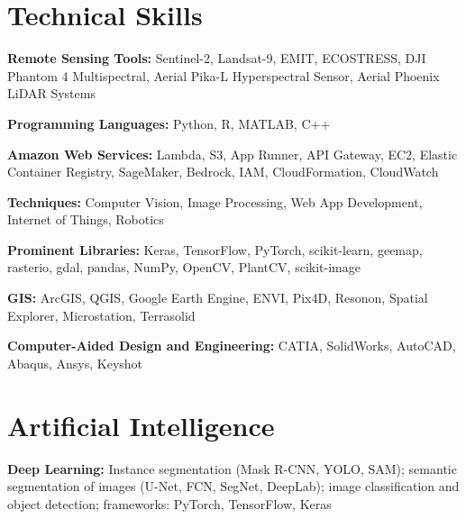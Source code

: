 \documentclass[11pt,a4paper]{article}
\begin{document}
\section{Technical Skills}

\begin{skillbox}
\textbf{Remote Sensing Tools:} Sentinel-2, Landsat-9, EMIT, ECOSTRESS, DJI Phantom 4 Multispectral, Aerial Pika-L Hyperspectral Sensor, Aerial Phoenix LiDAR Systems
\end{skillbox}

\begin{skillbox}
\textbf{Programming Languages:} Python, R, MATLAB, C++
\end{skillbox}

\begin{skillbox}
\textbf{Amazon Web Services:} Lambda, S3, App Runner, API Gateway, EC2, Elastic Container Registry, SageMaker, Bedrock, IAM, CloudFormation, CloudWatch
\end{skillbox}

\begin{skillbox}
\textbf{Techniques:} Computer Vision, Image Processing, Web App Development, Internet of Things, Robotics
\end{skillbox}

\begin{skillbox}
\textbf{Prominent Libraries:} Keras, TensorFlow, PyTorch, scikit-learn, geemap, rasterio, gdal, pandas, NumPy, OpenCV, PlantCV, scikit-image
\end{skillbox}

\begin{skillbox}
\textbf{GIS:} ArcGIS, QGIS, Google Earth Engine, ENVI, Pix4D, Resonon, Spatial Explorer, Microstation, Terrasolid
\end{skillbox}

\begin{skillbox}
\textbf{Computer-Aided Design and Engineering:} CATIA, SolidWorks, AutoCAD, Abaqus, Ansys, Keyshot
\end{skillbox}

\section{Artificial Intelligence}

\begin{skillbox}
\textbf{Deep Learning:} Instance segmentation (Mask R-CNN, YOLO, SAM); semantic segmentation of images (U-Net, FCN, SegNet, DeepLab); image classification and object detection; frameworks: PyTorch, TensorFlow, Keras
\end{skillbox}
\end{document}
